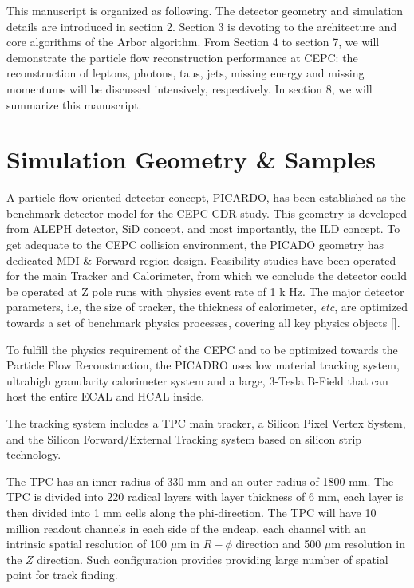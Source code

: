 This manuscript is organized as following.
The detector geometry and simulation details are introduced in section 2.
Section 3 is devoting to the architecture and core algorithms of the Arbor algorithm.
From Section 4 to section 7, we will demonstrate the particle flow reconstruction performance at CEPC:
the reconstruction of leptons, photons, taus, jets, missing energy and missing momentums will be discussed intensively, respectively.
In section 8, we will summarize this manuscript. 

\section{ Simulation Geometry \& Samples }

A particle flow oriented detector concept, PICARDO, has been established as the benchmark detector model for the CEPC CDR study.
This geometry is developed from ALEPH detector, SiD concept, and most importantly, the ILD concept.
To get adequate to the CEPC collision environment, the PICADO geometry has dedicated MDI \& Forward region design.
Feasibility studies have been operated for the main Tracker and Calorimeter,
from which we conclude the detector could be operated at Z pole runs with physics event rate of 1 k Hz.
The major detector parameters, i.e, the size of tracker, the thickness of calorimeter, {\it etc},
are optimized towards a set of benchmark physics processes, covering all key physics objects []. 

To fulfill the physics requirement of the CEPC and to be optimized towards the Particle Flow Reconstruction,
the PICADRO uses low material tracking system, ultrahigh granularity calorimeter system and a large,
3-Tesla B-Field that can host the entire ECAL and HCAL inside. 


The tracking system includes a TPC main tracker,
a Silicon Pixel Vertex System, and the Silicon Forward/External Tracking system based on silicon strip technology. 

The TPC has an inner radius of 330 mm and an outer radius of 1800 mm.
The TPC is divided into 220 radical layers with layer thickness of 6 mm,
each layer is then divided into 1 mm cells along the phi-direction.
The TPC will have 10 million readout channels in each side of the endcap,
each channel with an intrinsic spatial resolution of 100 $\mu$m
in $R-\phi$ direction and 500 $\mu$m resolution in the $Z$ direction.
Such configuration provides providing large number of spatial point for track finding.

